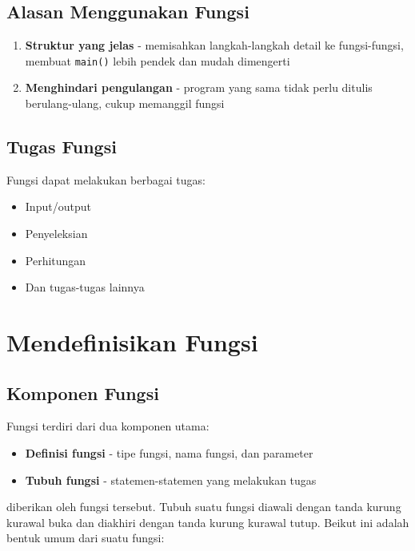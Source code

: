 \subsection{Alasan Menggunakan Fungsi}

\begin{enumerate}
\item \textbf{Struktur yang jelas} - memisahkan langkah-langkah detail ke fungsi-fungsi, membuat \texttt{main()} lebih pendek dan mudah dimengerti
\item \textbf{Menghindari pengulangan} - program yang sama tidak perlu ditulis berulang-ulang, cukup memanggil fungsi
\end{enumerate}

\subsection{Tugas Fungsi}

Fungsi dapat melakukan berbagai tugas:
\begin{itemize}
\item Input/output
\item Penyeleksian
\item Perhitungan
\item Dan tugas-tugas lainnya
\end{itemize}

\section{Mendefinisikan Fungsi}\label{mendefinisikan-fungsi}

\subsection{Komponen Fungsi}

Fungsi terdiri dari dua komponen utama:
\begin{itemize}
\item \textbf{Definisi fungsi} - tipe fungsi, nama fungsi, dan parameter
\item \textbf{Tubuh fungsi} - statemen-statemen yang melakukan tugas
\end{itemize}
diberikan oleh fungsi tersebut. Tubuh suatu fungsi diawali dengan tanda
kurung kurawal buka dan diakhiri dengan tanda kurung kurawal tutup.
Beikut ini adalah bentuk umum dari suatu fungsi:




